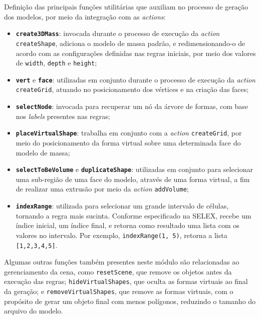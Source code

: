 Definição das principais funções utilitárias que auxiliam no processo de geração dos modelos, por meio da integração com as \textit{actions}:

\begin{itemize}
    \item \textbf{\texttt{create3DMass}}: invocada durante o processo de execução da \textit{action} \texttt{createShape}, adiciona o modelo de massa padrão, e redimensionando-o de acordo com as configurações definidas nas regras iniciais, por meio dos valores de \texttt{width}, \texttt{depth} e \texttt{height};
    
    \item \textbf{\texttt{vert}} e \textbf{\texttt{face}}: utilizadas em conjunto durante o processo de execução da \textit{action} \texttt{createGrid}, atuando no posicionamento dos vértices e na criação das faces;
    
    \item \textbf{\texttt{selectNode}}: invocada para recuperar um nó da árvore de formas, com base nos \textit{labels} presentes nas regras;
    
    \item \textbf{\texttt{placeVirtualShape}}: trabalha em conjunto com a \textit{action} \texttt{createGrid}, por meio do posicionamento da forma virtual sobre uma determinada face do modelo de massa;
    
    \item \textbf{\texttt{selectToBeVolume}} e \textbf{\texttt{duplicateShape}}: utilizadas em conjunto para selecionar uma sub-região de uma face do modelo, através de uma forma virtual, a fim de realizar uma extrusão por meio da \textit{action} \texttt{addVolume};
    
    \item \textbf{\texttt{indexRange}}: utilizada para selecionar um grande intervalo de células, tornando a regra mais sucinta. Conforme especificado na \gls{SELEX}, recebe um índice inicial, um índice final, e retorna como resultado uma lista com os valores no intervalo. Por exemplo, \texttt{indexRange(1,\,5)}, retorna a lista \texttt{[1,2,3,4,5]}.
\end{itemize}

Algumas outras funções também presentes neste módulo são relacionadas ao gerenciamento da cena, como \texttt{resetScene}, que remove os objetos antes da execução das regras; \texttt{hideVirtualShapes}, que oculta as formas virtuais ao final da geração; e \texttt{removeVirtualShapes}, que remove as formas virtuais, com o propósito de gerar um objeto final com menos polígonos, reduzindo o tamanho do arquivo do modelo.


